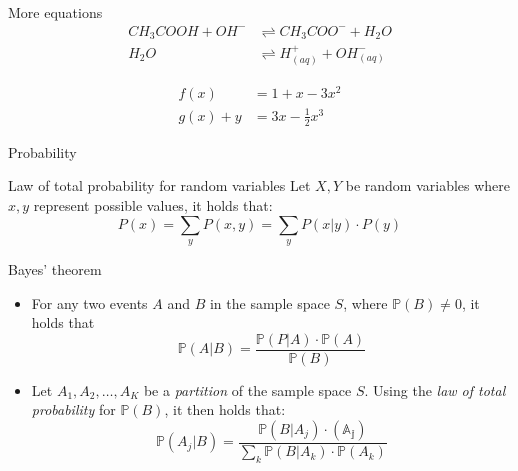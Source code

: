 \documentclass[aspectratio=169,hyperref={pdfpagelabels=false}]{beamer}
\begin{document}
\begin{frame}{More equations}
\begin{equation}
\begin{aligned} 
    CH_3COOH + OH^{-} &\rightleftharpoons CH_3COO^{-} + H_2O \\
    H_2O &\rightleftharpoons H^{+}_{(aq)} + OH^{-}_{(aq)}
\end{aligned}
\end{equation}


\begin{align} 
    \label{eq:align1}     
    f(x) &= 1 + x - 3 x^2 \\
    \label{eq:align2} 
    g(x) + y &= 3x - \frac{1}{2} x^3 
\end{align}
\end{frame}

\begin{frame}[allowframebreaks]{Probability}
    \begin{block}{Law of total probability for random variables}
    Let \(X,Y\) be random variables where \(x,y\) represent possible values, it holds that:
    \[
        P(x) = \sum_y P(x,y) = \sum_y P(x|y)\cdot P(y)
    \]
    \end{block}
    \framebreak
    
    
    \begin{block}{Bayes' theorem}
    \begin{itemize}
        \item For any two events \(A\) and \(B\) in the sample space \(S\), where \(\mathds{P}(B) \neq 0\), it holds that
        \[\mathds{P}(A|B) = \frac{\mathds{P}(P|A) \cdot \mathds{P}(A)}{\mathds{P}(B)}\]
        \item Let \(A_1, A_2, \dots , A_K\) be a \textit{partition} of the sample space \(S\). Using the \textit{law of total probability} for \(\mathds{P}(B)\), it then holds that:
        \[
            \mathds{P}(A_j | B) = \frac{\mathds{P}(B|A_j) \cdot \mathds{(A_j)}}{\sum_k \mathds{P}(B|A_k) \cdot \mathds{P}(A_k)}
        \]
    \end{itemize}
    \end{block}
\end{frame}
\end{document}
